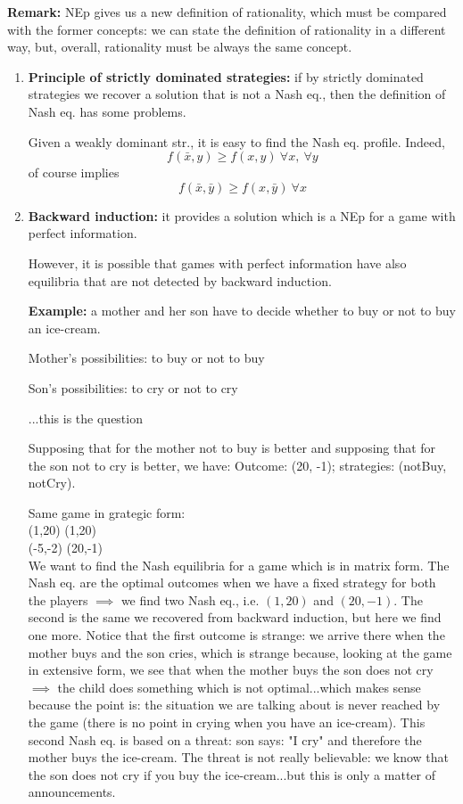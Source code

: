 \bigskip
\noindent \textbf{Remark:} NEp gives us a new definition of rationality, 
which must be compared with the former concepts: we can state the 
definition of rationality in a different way, but, overall, rationality must be 
always the same concept.
\begin{enumerate}
	\item \textbf{Principle of strictly dominated strategies:} if by strictly 
	dominated strategies we recover a solution that is not a Nash eq., then 
	the definition of Nash eq. has some problems. 
	
	\noindent Given a weakly dominant str., it is easy to find the Nash 
	eq. profile. Indeed,
	\[
	f(\bar{x},y) \geq f(x,y) ~\forall x,~\forall y
	\]
	of course implies
	\[
	f(\bar{x},\bar{y}) \geq f(x,\bar{y}) ~\forall x
	\]
	
	\item \textbf{Backward induction:} it provides a solution which is a 
	NEp for a game with perfect information.
	
	\noindent However, it is possible that games with perfect information 
	have also equilibria that are not detected by backward induction.
	
	\noindent \textbf{Example:} a mother and her son have to decide whether to 
	buy or not to buy an ice-cream.
	
	\noindent Mother's possibilities: to buy or not to buy
	
	\noindent Son's possibilities: to cry or not to cry
	
	\noindent ...this is the question
	
	\noindent Supposing that for the mother not to buy is better and 
	supposing that for the son not to cry is better, we have: 
	Outcome: (20, -1); strategies: (notBuy, notCry).
	
	\noindent Same game in grategic form:\\
	(1,20)	(1,20)\\
	(-5,-2)	(20,-1)\\
	
	\noindent We want to find the Nash equilibria for a game which is in 
	matrix form. The Nash eq. are the optimal outcomes when we have a fixed 
	strategy for both the players $\implies$ we find two Nash eq., i.e. $(1,20)$ 
	and $(20,-1)$. The second is the same we recovered from backward 
	induction, but here we find one more. Notice that the first outcome is 
	strange: we arrive there when the mother buys and the son cries, which 
	is strange because, looking at the game in extensive form, we see that 
	when the mother buys the son does not cry $\implies$ the child does something 
	which is not optimal...which makes sense because the point is: the 
	situation we are talking about is never reached by the game (there is 
	no point in crying when you have an ice-cream). This second Nash eq. is 
	based on a threat: son says: "I cry" and therefore the mother buys the 
	ice-cream. The threat is not really believable: we know that the son 
	does not cry if you buy the ice-cream...but this is only a matter of 
	announcements.
	

\end{enumerate}
